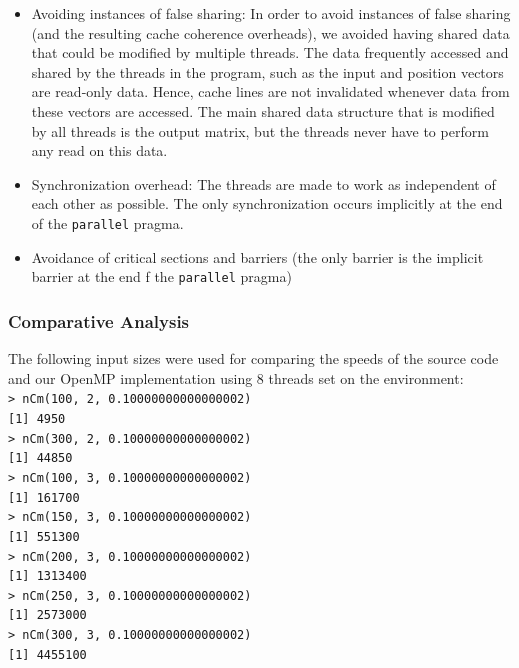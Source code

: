 \begin{itemize}
\item Avoiding instances of false sharing: In order to avoid instances of false sharing (and the resulting cache coherence overheads), we avoided having shared data that could be modified by multiple threads. The data frequently accessed and shared by the threads in the program, such as the input and position vectors are read-only data. Hence, cache lines are not invalidated whenever data from these vectors are accessed. The main shared data structure that is modified by all threads is the output matrix, but the threads never have to perform any read on this data.

\item Synchronization overhead: The threads are made to work as independent of each other as possible. The only synchronization occurs implicitly at the end of the \texttt{parallel} pragma.

\item Avoidance of critical sections and barriers (the only barrier is the implicit barrier at the end f the \texttt{parallel} pragma)

\end{itemize}


\subsubsection{Comparative Analysis}
The following input sizes were used for comparing the speeds of the source code and our OpenMP implementation using 8 threads set on the environment:\\
\null
\texttt{> nCm(100, 2, 0.10000000000000002)}\\
\texttt{[1] 4950}\\
\texttt{> nCm(300, 2, 0.10000000000000002)}\\
\texttt{[1] 44850}\\
\texttt{> nCm(100, 3, 0.10000000000000002)}\\
\texttt{[1] 161700}\\
\texttt{> nCm(150, 3, 0.10000000000000002)}\\
\texttt{[1] 551300}\\
\texttt{> nCm(200, 3, 0.10000000000000002)}\\
\texttt{[1] 1313400}\\
\texttt{> nCm(250, 3, 0.10000000000000002)}\\
\texttt{[1] 2573000}\\
\texttt{> nCm(300, 3, 0.10000000000000002)}\\
\texttt{[1] 4455100}\\
\null

